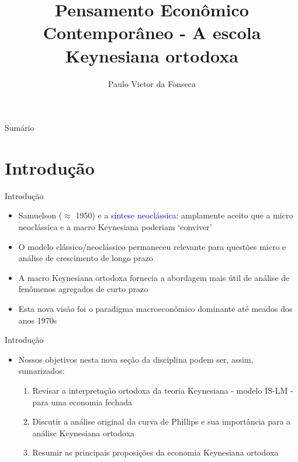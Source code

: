 \documentclass[10pt]{beamer}
\title[]{Pensamento Econômico Contemporâneo - A escola Keynesiana ortodoxa}
\author[]{Paulo Victor da Fonseca}
\date{}
\begin{document}
\begin{frame}[plain]
\end{frame}

\begin{frame}{Sumário}
    \tableofcontents
\end{frame}

\section{Introdução}
\begin{frame}{Introdução}
    \begin{itemize}
        \item Samuelson ($\approx$ 1950) e a \textcolor{blue}{síntese neoclássica}: amplamente aceito que a micro neoclássica e a macro Keynesiana poderiam `conviver'
        \bigskip
        \item O modelo clássico/neoclássico permaneceu relevante para questões micro e análise de crescimento de longo prazo
        \bigskip
        \item A macro Keynesiana ortodoxa fornecia a abordagem mais útil de análise de fenômenos agregados de curto prazo
        \bigskip
        \item Esta nova visão foi o paradigma macroeconômico dominante até meados dos anos 1970s
    \end{itemize}
\end{frame}

\begin{frame}{Introdução}
    \begin{itemize}
        \item Nossos objetivos nesta nova seção da disciplina podem ser, assim, sumarizados:
        \bigskip
        \begin{enumerate}
            \item Revisar a interpretação ortodoxa da teoria Keynesiana - modelo IS-LM - para uma economia fechada
            \medskip
            \item Discutir a análise original da curva de Phillips e sua importância para a análise Keynesiana ortodoxa
            \medskip
            \item Resumir as principais proposições da economia Keynesiana ortodoxa
        \end{enumerate}
    \end{itemize}
\end{frame}
\end{document}
